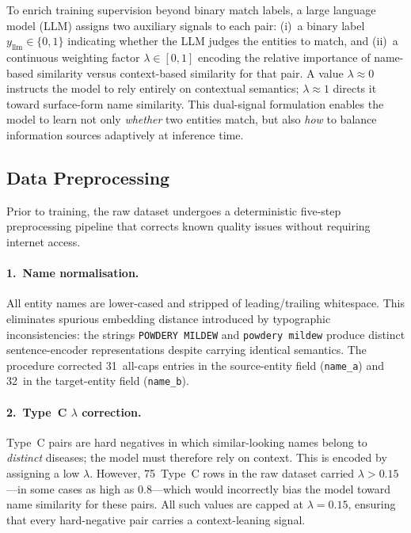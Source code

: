 To enrich training supervision beyond binary match labels, a large
language model (LLM) assigns two auxiliary signals to each pair:
(i)~a binary label $y_{\text{llm}}\!\in\!\{0,1\}$ indicating whether
the LLM judges the entities to match, and
(ii)~a continuous weighting factor $\lambda\!\in\![0,1]$ encoding the
relative importance of name-based similarity versus context-based
similarity for that pair.
A value $\lambda\!\approx\!0$ instructs the model to rely entirely on
contextual semantics; $\lambda\!\approx\!1$ directs it toward surface-form
name similarity.
This dual-signal formulation enables the model to learn not only
\emph{whether} two entities match, but also \emph{how} to balance
information sources adaptively at inference time.

\subsection{Data Preprocessing}
\label{sec:preproc}

Prior to training, the raw dataset undergoes a deterministic five-step
preprocessing pipeline that corrects known quality issues without
requiring internet access.

\paragraph{1.\ Name normalisation.}
All entity names are lower-cased and stripped of leading/trailing
whitespace. This eliminates spurious embedding distance introduced by
typographic inconsistencies: the strings \texttt{POWDERY MILDEW} and
\texttt{powdery mildew} produce distinct sentence-encoder representations
despite carrying identical semantics. The procedure corrected
31~all-caps entries in the source-entity field (\texttt{name\_a}) and
32~in the target-entity field (\texttt{name\_b}).

\paragraph{2.\ Type~C $\lambda$ correction.}
Type~C pairs are hard negatives in which similar-looking names belong
to \emph{distinct} diseases; the model must therefore rely on context.
This is encoded by assigning a low $\lambda$. However, 75~Type~C rows
in the raw dataset carried $\lambda > 0.15$---in some cases as high
as $0.8$---which would incorrectly bias the model toward name similarity
for these pairs. All such values are capped at $\lambda\!=\!0.15$,
ensuring that every hard-negative pair carries a context-leaning signal.

